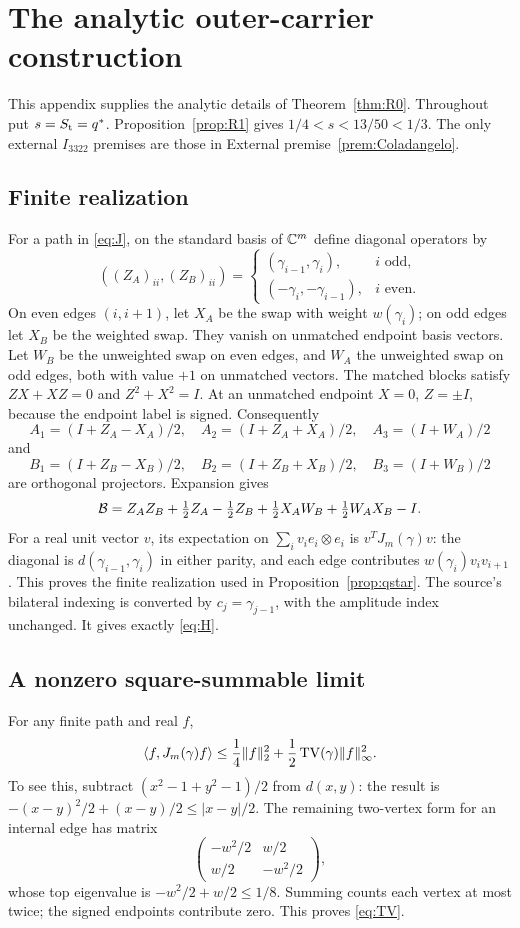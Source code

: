 \section{The analytic outer-carrier construction}\label{app:carrier}
This appendix supplies the analytic details of Theorem~\ref{thm:R0}.
Throughout put \(s=S_{\mathrm t}=q^*\). Proposition~\ref{prop:R1} gives
\(1/4<s<13/50<1/3\). The only external \(I_{3322}\) premises are
those in External premise~\ref{prem:Coladangelo}.

\subsection{Finite realization}\label{app:realization}
For a path in \eqref{eq:J}, on the standard basis of \(\mathbb C^m\) define
diagonal operators by
\[
 ((Z_A)_{ii},(Z_B)_{ii})=
 \begin{cases}
  (\gamma_{i-1},\gamma_i),&i\text{ odd},\\
  (-\gamma_i,-\gamma_{i-1}),&i\text{ even}.
 \end{cases}
\]
On even edges \((i,i+1)\), let \(X_A\) be the swap with weight
\(w(\gamma_i)\); on odd edges let \(X_B\) be the weighted swap.
They vanish on unmatched endpoint basis vectors. Let \(W_B\) be the
unweighted swap on even edges, and \(W_A\) the unweighted swap on odd
edges, both with value \(+1\) on unmatched vectors. The matched blocks
satisfy \(ZX+XZ=0\) and \(Z^2+X^2=I\). At an unmatched endpoint
\(X=0\), \(Z=\pm I\), because the endpoint label is signed. Consequently
\[
 A_1=(I+Z_A-X_A)/2,\quad A_2=(I+Z_A+X_A)/2,\quad A_3=(I+W_A)/2
\]
and
\[
 B_1=(I+Z_B-X_B)/2,\quad B_2=(I+Z_B+X_B)/2,\quad B_3=(I+W_B)/2
\]
are orthogonal projectors. Expansion gives
\[
 \mathcal B=Z_AZ_B+\tfrac12 Z_A-\tfrac12 Z_B+
        \tfrac12 X_AW_B+\tfrac12 W_AX_B-I.
\]
For a real unit vector \(v\), its expectation on
\(\sum_i v_ie_i\otimes e_i\) is \(v^TJ_m(\gamma)v\):
the diagonal is \(d(\gamma_{i-1},\gamma_i)\) in either parity, and
each edge contributes \(w(\gamma_i)v_iv_{i+1}\). This proves the
finite realization used in Proposition~\ref{prop:qstar}. The source's
bilateral indexing is converted by \(c_j=\gamma_{j-1}\), with the
amplitude index unchanged. It gives exactly \eqref{eq:H}.

\subsection{A nonzero square-summable limit}\label{app:compactness}
For any finite path and real \(f\),
\begin{equation}\label{eq:TV}
 \langle f,J_m(\gamma)f\rangle
 \le \frac14\|f\|_2^2+\frac12\operatorname{TV}(\gamma)\|f\|_\infty^2.
\end{equation}
To see this, subtract \((x^2-1+y^2-1)/2\) from \(d(x,y)\):
the result is \(-(x-y)^2/2+(x-y)/2\le |x-y|/2\).
The remaining two-vertex form for an internal edge has matrix
\[
 \begin{pmatrix}-w^2/2&w/2\\w/2&-w^2/2\end{pmatrix},
\]
whose top eigenvalue is \(-w^2/2+w/2\le1/8\).
Summing counts each vertex at most twice; the signed endpoints
contribute zero. This proves \eqref{eq:TV}.

